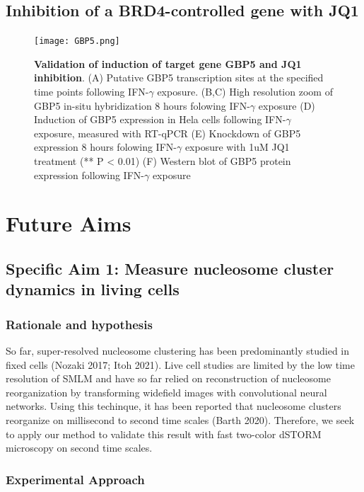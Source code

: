 \documentclass{ucetd}
\begin{document}
\subsection{Inhibition of a BRD4-controlled gene with JQ1}

\begin{figure}
\begin{center}
\texttt{[image: GBP5.png]}
\end{center}
\caption{\textbf{Validation of induction of target gene GBP5 and JQ1 inhibition}. (A) Putative GBP5 transcription sites at the specified time points following IFN-$\gamma$ exposure. (B,C) High resolution zoom of GBP5 in-situ hybridization 8 hours folowing IFN-$\gamma$ exposure (D) Induction of GBP5 expression in Hela cells following IFN-$\gamma$ exposure, measured with RT-qPCR (E) Knockdown of GBP5 expression 8 hours folowing IFN-$\gamma$ exposure with 1uM JQ1 treatment (** P < 0.01) (F) Western blot of GBP5 protein expression following IFN-$\gamma$ exposure}
\end{figure}

\clearpage
\section{Future Aims}

\subsection{Specific Aim 1: Measure nucleosome cluster dynamics in living cells}

\subsubsection{Rationale and hypothesis}

So far, super-resolved nucleosome clustering has been predominantly studied in fixed cells (Nozaki 2017; Itoh 2021). Live cell studies are limited by the low time resolution of SMLM and have so far relied on reconstruction of nucleosome reorganization by transforming widefield images with convolutional neural networks. Using this techinque, it has been reported that nucleosome clusters reorganize on millisecond to second time scales (Barth 2020).  Therefore, we seek to apply our method to validate this result with fast two-color dSTORM microscopy on second time scales. 

\subsubsection{Experimental Approach}
\end{document}
